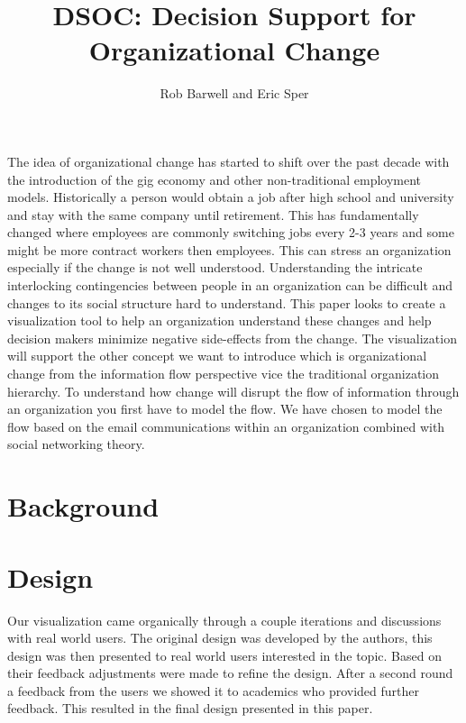 \documentclass[journal]{vgtc}                %
\title{DSOC: Decision Support for Organizational Change}
\author{Rob Barwell and Eric Sper}
\begin{document}

\maketitle
The idea of organizational change has started to shift over the past decade with the introduction of the gig economy and other non-traditional employment models.  Historically a person would obtain a job after high school and university and stay with the same company until retirement.  This has fundamentally changed where employees are commonly switching jobs every 2-3 years and some might be more contract workers then employees.  This can stress an organization especially if the change is not well understood.  Understanding the intricate interlocking contingencies between people in an organization can be difficult and changes to its social structure hard to understand.  This paper looks to create a visualization tool to help an organization understand these changes and help decision makers minimize negative side-effects from the change.
The visualization will support the other concept we want to introduce which is organizational change from the information flow perspective vice the traditional organization hierarchy.  To understand how change will disrupt the flow of information through an organization you first have to model the flow.  We have chosen to model the flow based on the email communications within an organization combined with social networking theory.

\section{Background}

\section{Design}

Our visualization came organically through a couple iterations and discussions with real world users.  The original design was developed by the authors, this design was then presented to real world users interested in the topic.  Based on their feedback adjustments were made to refine the design.  After a second round a feedback from the users we showed it to academics who provided further feedback.  This resulted in the final design presented in this paper.
\end{document}
